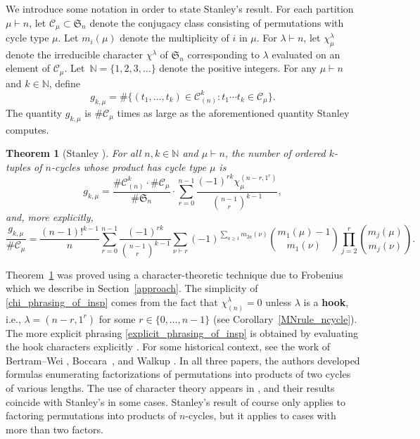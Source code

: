 \documentclass[10pt]{article}
\newtheorem{theorem}{Theorem}[section]
\theoremstyle{definition}
\newcommand{\CC}{\mathcal{C}}
\newcommand{\N}{\mathbb{N}}
\newcommand{\FS}{\mathfrak{S}}
\newcommand{\myemph}{\textbf}
\begin{document}
We introduce some notation in order to state Stanley's result.
For each partition \(\mu \vdash n\),
let \(\CC_\mu \subset \FS_n\) denote the conjugacy class consisting of permutations with cycle type \(\mu\).
Let \(m_i (\mu) \) denote the multiplicity of \(i\) in \(\mu\).
For \(\lambda \vdash n\), let \(\chi^\lambda_\mu\) denote the irreducible character \(\chi^\lambda\) of \(\FS_n\) corresponding to \(\lambda\) evaluated on an element of \(\CC_\mu\).
Let~\(\N = \{1,2,3,\ldots\}\) denote the positive integers.
For any \(\mu \vdash n\) and \(k \in \N\), define
\begin{equation}
\label{g_kmu_defn}
g_{k,\mu} = \# \{(t_1,\ldots,t_k) \in \CC_{(n)}^k : t_1\cdots t_k \in \CC_\mu\}.
\end{equation}
The quantity \(g_{k,\mu}\) is \(\#\CC_\mu\) times as large as the aforementioned quantity Stanley computes.
\begin{theorem}[Stanley {\cite[Theorem~3.1]{ncycle}}]
\label{inspiration}
For all \(n,k \in \N\) and \(\mu \vdash n\), the number of ordered \(k\)-tuples of \(n\)-cycles whose product has cycle type \(\mu\) is
\begin{equation}
\label{chi_phrasing_of_insp}
g_{k,\mu}
=
\frac{\# \CC_{(n)}^k \cdot \#\CC_\mu}{\# \FS_n}
\cdot
\sum_{r=0}^{n-1}
\frac{(-1)^{rk} \chi^{(n-r,1^r)}_\mu}{\binom{n-1}{r}^{k-1}},
\end{equation}
and, more explicitly,
\begin{equation}
\label{explicit_phrasing_of_insp}
\frac{g_{k,\mu}}{\# \CC_\mu}
=
\frac{(n-1)!^{k-1}}{n}
\sum_{r=0}^{n-1}
\frac{(-1)^{rk}}{\binom{n-1}{r}^{k-1}}
\sum_{\nu \vdash r}
(-1)^{\sum_{a \geq 1} m_{2a}(\nu)}
\binom{m_1(\mu)-1}{m_1(\nu)}
\prod_{j = 2}^{r}
\binom{m_j(\mu)}{m_j(\nu)}.
\end{equation}
\end{theorem}

Theorem~\ref{inspiration} was proved using a character-theoretic technique due to Frobenius which we describe in Section~\ref{approach}.
The simplicity of \eqref{chi_phrasing_of_insp} comes from the fact that \(\chi^\lambda_{(n)} = 0\) unless \(\lambda\) is a \myemph{hook}, i.e., \(\lambda = (n-r,1^r)\) for some \(r \in \{0,\ldots,n-1\}\) (see Corollary~\ref{MNrule_ncycle}).
The more explicit phrasing \eqref{explicit_phrasing_of_insp} is obtained by evaluating the hook characters explicitly \cite[Lemma~2.2]{ncycle}.
For some historical context, see the work of Bertram--Wei \cite{bertram_wei}, Boccara~\cite{boccara}, and Walkup \cite{walkup}.
In all three papers, the authors developed formulas enumerating factorizations of permutations into products of two cycles of various lengths.
The use of character theory appears in \cite[{Section~3}]{bertram_wei}, and their results coincide with Stanley's in some cases.
Stanley's result of course only applies to factoring permutations into products of \(n\)-cycles, but it applies to cases with more than two factors.
\end{document}
